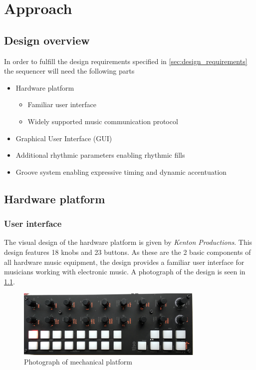 \chapter{Approach}

\section{Design overview}
In order to fulfill the design requirements specified in \cref{sec:design_requirements} the sequencer will need the following parts

\begin{itemize}
\item Hardware platform
    \begin{itemize}
        \item Familiar user interface
        \item Widely supported music communication protocol
    \end{itemize}
\item Graphical User Interface (GUI)
\item Additional rhythmic parameters enabling rhythmic fills
\item Groove system enabling expressive timing and dynamic accentuation
\end{itemize}

\section{Hardware platform}

\subsection{User interface}
\label{sec:UI}

The visual design of the hardware platform is given by \textit{Kenton Productions}. This design features 18 knobs and 23 buttons. As these  are the 2 basic components of all hardware music equipment, the design provides a familiar user interface for musicians working with electronic music. A photograph of the design is seen in \cref{fig:torso}.

\begin{figure}[H]
    \centering
    \includegraphics[width=0.8\textwidth]{graphics/front_scaled.png}
    \caption{Photograph of mechanical platform}
    \label{fig:torso}
\end{figure}

